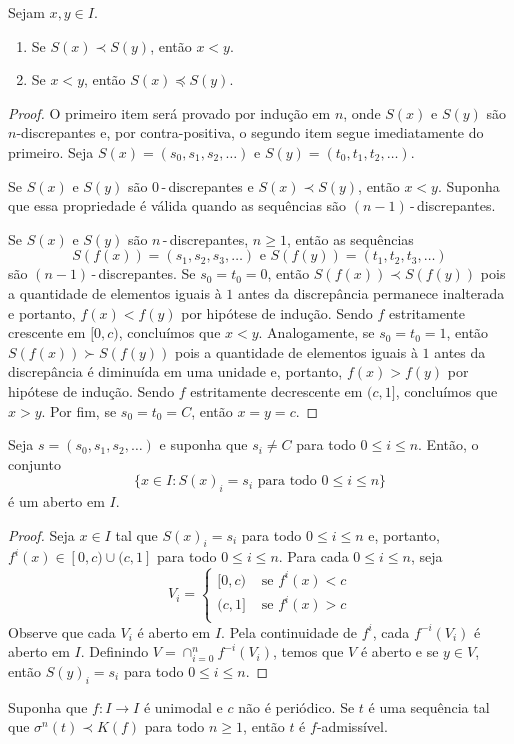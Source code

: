 \begin{theorem}
Sejam $x, y \in I$.
\begin{enumerate}
\item Se $S(x) \prec S(y)$, então $x < y$.
\item Se $x < y$, então $S(x) \preceq S(y)$.
\end{enumerate}
\end{theorem}

\begin{proof}
O primeiro item será provado por indução em $n$, onde $S(x)$ e $S(y)$ são $n$-discrepantes e, por contra-positiva, o segundo item segue imediatamente do primeiro. Seja $S(x) = (s_0, s_1, s_2, \dots)$ e $S(y) = (t_0, t_1, t_2, \dots)$.

Se $S(x)$ e $S(y)$ são $0$\,-\,discrepantes e $S(x) \prec S(y)$, então $x < y$. Suponha que essa propriedade é válida quando as sequências são $(n-1)$\,-\,discrepantes.

Se $S(x)$ e $S(y)$ são $n$\,-\,discrepantes, $n \geq 1$, então as sequências
$$S(f(x)) = (s_1, s_2, s_3, \dots) \textrm{ e } S(f(y)) = (t_1, t_2, t_3, \dots)$$
são $(n-1)$\,-\,discrepantes. Se $s_0 = t_0 = 0$, então $S(f(x)) \prec S(f(y))$ pois a quantidade de elementos iguais à $1$ antes da discrepância permanece inalterada e portanto, $f(x) < f(y)$ por hipótese de indução. Sendo $f$ estritamente crescente em $[0, c)$, concluímos que $x < y$. Analogamente, se $s_0 = t_0 = 1$, então $S(f(x)) \succ S(f(y))$ pois a quantidade de elementos iguais à $1$ antes da discrepância é diminuída em uma unidade e, portanto, $f(x) > f(y)$ por hipótese de indução. Sendo $f$ estritamente decrescente em $(c, 1]$, concluímos que $x > y$. Por fim, se $s_0 = t_0 = C$, então $x = y = c$.
\end{proof}

\begin{lemma}
Seja $s = (s_0, s_1, s_2, \dots)$ e suponha que $s_i \neq C$ para todo $0 \leq i \leq n$. Então, o conjunto
$$\{ x \in I : S(x)_i = s_i \textrm{ para todo } 0 \leq i \leq n \}$$
é um aberto em $I$.
\end{lemma}

\begin{proof}
Seja $x \in I$ tal que $S(x)_i = s_i$ para todo $0 \leq i \leq n$ e, portanto, $f^i(x) \in [0,c) \cup (c, 1]$ para todo $0 \leq i \leq n$. Para cada $0 \leq i \leq n$, seja
\[ V_i = 
\begin{cases} 
  [0, c) & \textrm{ se } f^i(x) < c \\
  (c, 1] & \textrm{ se } f^i(x) > c \\
\end{cases}
\]
Observe que cada $V_i$ é aberto em $I$. Pela continuidade de $f^i$, cada $f^{-i}(V_i)$ é aberto em $I$. Definindo $V = \cap_{i=0}^n f^{-i}(V_i)$, temos que $V$ é aberto e se $y \in V$, então $S(y)_i = s_i$ para todo $0 \leq i \leq n$.  
\end{proof}

\begin{theorem}
Suponha que $f: I \to I$ é unimodal e $c$ não é periódico. Se $t$ é uma sequência tal que $\sigma^n(t) \prec K(f)$ para todo $n \geq 1$, então $t$ é $f$-admissível.
\end{theorem}
